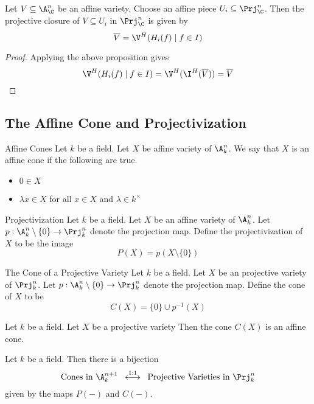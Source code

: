 \documentclass[a4paper]{article}
\begin{document}
\begin{crl}{}{} Let $V\subseteq\A_\C^n$ be an affine variety. Choose an affine piece $U_i\subseteq\Prj_\C^n$. Then the projective closure of $V\subseteq U_i$ in $\Prj_\C^n$ is given by $$\overline{V}=\V^H(H_i(f)\;|\;f\in I)$$ \tcbline
\begin{proof}
Applying the above proposition gives $$\V^H(H_i(f)\;|\;f\in I)=\V^H(\I^H(\overline{V}))=\overline{V}$$
\end{proof}
\end{crl}

\subsection{The Affine Cone and Projectivization}
\begin{defn}{Affine Cones}{} Let $k$ be a field. Let $X$ be affine variety of $\A_k^n$. We say that $X$ is an affine cone if the following are true. 
\begin{itemize}
\item $0\in X$
\item $\lambda x\in X$ for all $x\in X$ and $\lambda\in k^\times$
\end{itemize}
\end{defn}

\begin{defn}{Projectivization}{} Let $k$ be a field. Let $X$ be an affine variety of $\A_k^n$. Let $p:\A_k^n\setminus\{0\}\to\Prj_k^n$ denote the projection map. Define the projectivization of $X$ to be the image $$P(X)=p(X\setminus\{0\})$$
\end{defn}

\begin{defn}{The Cone of a Projective Variety}{} Let $k$ be a field. Let $X$ be an projective variety of $\Prj_k^n$. Let $p:\A_k^n\setminus\{0\}\to\Prj_k^n$ denote the projection map. Define the cone of $X$ to be $$C(X)=\{0\}\cup p^{-1}(X)$$
\end{defn}

\begin{lmm}{}{} Let $k$ be a field. Let $X$ be a projective variety Then the cone $C(X)$ is an affine cone. 
\end{lmm}

\begin{prp}{}{} Let $k$ be a field. Then there is a bijection $$\text{Cones in }\A_k^{n+1}\;\;\overset{1:1}{\longleftrightarrow}\;\;\text{Projective Varieties in }\Prj_k^n$$ given by the maps $P(-)$ and $C(-)$. 
\end{prp}
\end{document}
